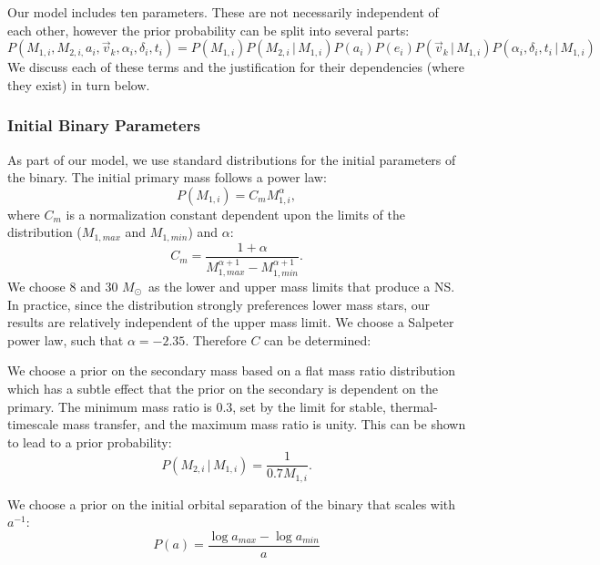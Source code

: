 \documentclass[12pt, preprint]{aastex}
\newcommand{\given}{\,|\,}
\newcommand{\Msun}{\ifmmode {M_{\odot}}\else${M_{\odot}}$\fi}
\begin{document}
Our model includes ten parameters. These are not necessarily independent of each other, however the prior probability can be split into several parts:
\begin{equation}
P(M_{1,i}, M_{2,i,} a_i, \vec{v}_k, \alpha_i, \delta_i, t_i) = P(M_{1,i}) P(M_{2,i} \given M_{1,i}) P(a_i) P(e_i) P(\vec{v}_k \given M_{1,i}) P(\alpha_i, \delta_i, t_i \given M_{1,i})
\end{equation}
We discuss each of these terms and the justification for their dependencies (where they exist) in turn below.

\subsubsection{Initial Binary Parameters}

As part of our model, we use standard distributions for the initial parameters of the binary. The initial primary mass follows a power law:
\begin{equation}
P(M_{1,i}) = C_m M_{1,i}^{\alpha},
\end{equation}
where $C_m$ is a normalization constant dependent upon the limits of the distribution ($M_{1,max}$ and $M_{1,min}$) and $\alpha$:
\begin{equation}
C_m = \frac{1 + \alpha}{M_{1,max}^{\alpha+1} - M_{1,min}^{\alpha+1}}.
\end{equation}
We choose 8 and 30 \Msun\ as the lower and upper mass limits that produce a NS. In practice, since the distribution strongly preferences lower mass stars, our results are relatively independent of the upper mass limit. We choose a Salpeter power law, such that $\alpha = -2.35$. Therefore $C$ can be determined:

We choose a prior on the secondary mass based on a flat mass ratio distribution which has a subtle effect that the prior on the secondary is dependent on the primary. The minimum mass ratio is 0.3, set by the limit for stable, thermal-timescale mass transfer, and the maximum mass ratio is unity. This can be shown to lead to a prior probability:
\begin{equation}
P(M_{2,i} \given M_{1,i}) = \frac{1}{0.7 M_{1,i}}.
\end{equation}

We choose a prior on the initial orbital separation of the binary that scales with $a^{-1}$:
\begin{equation}
P(a) = \frac{\log a_{max} - \log a_{min}}{a}
\end{equation}
\end{document}
